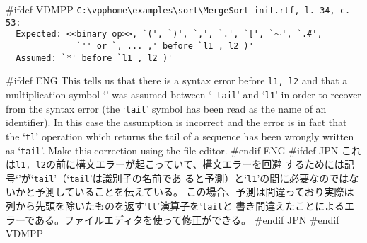 \documentclass[\pformat,12pt]{article}
\begin{document}
#ifdef VDMPP
\verb!C:\vpphome\examples\sort\MergeSort-init.rtf, l. 34, c. 53:! \\
 \verb!  Expected: <<binary op>>, `(', `)', `,', `.', `[', `!{\tt $\sim$}\verb!', `.#',! \\
 \verb!              `'' or `, ... ,' before `l1 , l2 )'! \\
 \verb!  Assumed: `*' before `l1 , l2 )'!

#ifdef ENG
This tells us that there is a syntax error before {\tt l1, l2} and
that  a multiplication symbol `{\tt *}' was assumed between `{\tt
  tail}' and `{\tt l1}' in order to recover from the syntax error (the
`{\tt tail}' symbol has been read as the name of an identifier). In
this case the assumption is incorrect and the error is in fact that
the `{\tt tl}' operation which returns the tail of a sequence has been
wrongly written as `{\tt tail}'. Make this correction using the file
editor.
#endif ENG
#ifdef JPN
これは{\tt l1, l2}の前に構文エラーが起こっていて、構文エラーを回避
するためには記号`{\tt *}'が`{\tt tail}'（`{\tt tail}'は識別子の名前であ
ると予測）と`{\tt l1}'の間に必要なのではないかと予測していることを伝えている。
この場合、予測は間違っており実際は列から先頭を除いたものを返す`{\tt tl}'演算子を`{\tt tail}と
書き間違えたことによるエラーである。ファイルエディタを使って修正ができる。
#endif JPN
#endif VDMPP
\end{document}
